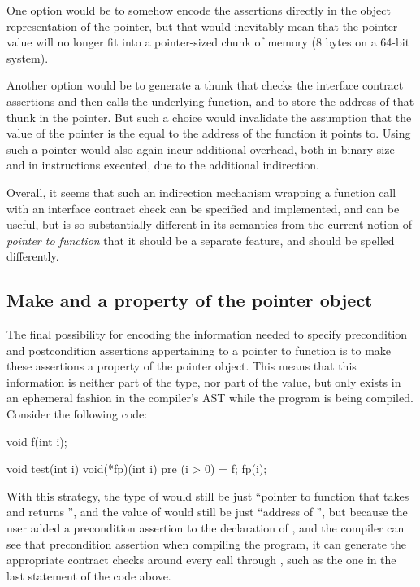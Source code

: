 One option would be to somehow encode the assertions directly in the object representation of the pointer, but that would inevitably mean that the pointer value will no longer fit into a pointer-sized chunk of memory (8 bytes on a 64-bit system).

Another option would be to generate a thunk that checks the interface contract assertions and then calls the underlying function, and to store the address of that thunk in the pointer. But such a choice would invalidate the assumption that the value of the pointer is the equal to the address of the function it points to. Using such a pointer would also again incur additional overhead, both in binary size and in instructions executed, due to the additional indirection.


Overall, it seems that such an indirection mechanism wrapping a function call with an interface contract check can be specified and implemented, and can be useful, but is so substantially different in its semantics from the current notion of \emph{pointer to function} that it should be a separate feature, and should be spelled differently.

\subsection{Make  and  a property of the pointer object}

The final possibility for encoding the information needed to specify precondition and postcondition assertions appertaining to a pointer to function is to make these assertions a property of the pointer object. This means that this information is neither part of the type, nor part of the value, but only exists in an ephemeral fashion in the compiler's AST while the program is being compiled. Consider the following code:
\begin{codeblock}
void f(int i);

void test(int i) {
  void(*fp)(int i) pre (i > 0) = f;
  fp(i);
}
\end{codeblock}
With this strategy, the type of  would still be just ``pointer to function that takes  and returns '', and the value of  would still be just ``address of '', but because the user added a precondition assertion to the declaration of , and the compiler can see that precondition assertion when compiling the program, it can generate the appropriate contract checks around every call through , such as the one in the last statement of the code above.

